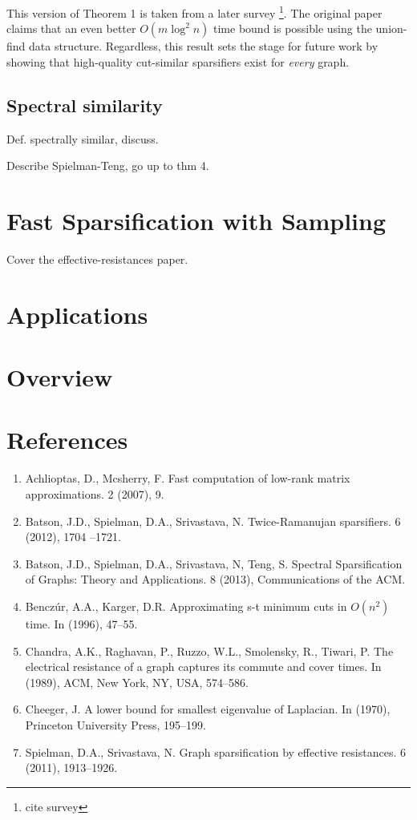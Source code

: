 \documentclass{article}
\begin{document}
This version of Theorem 1 is taken from a later survey \footnote{cite
survey}. The original paper claims that an even better $O(m\log^2 n)$ time
bound is possible using the union-find data structure. Regardless, this
result sets the stage for future work by showing that high-quality
cut-similar sparsifiers exist for \textit{every} graph. 

\subsection{Spectral similarity}

Def. spectrally similar, discuss.

Describe Spielman-Teng, go up to thm 4.

\section{Fast Sparsification with Sampling}

Cover the effective-resistances paper.

\section{Applications}

\section{Overview}

\section*{References}

\begin{enumerate}[1.]
    \item Achlioptas, D., Mcsherry, F. Fast computation of low-rank matrix
        approximations. 2 (2007), 9.

    \item Batson, J.D., Spielman, D.A., Srivastava, N.  Twice-Ramanujan
        sparsifiers. 6 (2012), 1704 –1721.

    \item Batson, J.D., Spielman, D.A., Srivastava, N, Teng, S.  Spectral
        Sparsification of Graphs: Theory and Applications. 8 (2013),
        Communications of the ACM.

    \item Bencz\'{u}r, A.A., Karger, D.R.  Approximating s-t minimum cuts in
        $O(n^2)$ time. In (1996), 47–55.

    \item Chandra, A.K., Raghavan, P., Ruzzo, W.L., Smolensky, R., Tiwari,
        P.  The electrical resistance of a graph captures its commute and
        cover times. In (1989), ACM, New York, NY, USA, 574–586.

    \item Cheeger, J. A lower bound for smallest eigenvalue of Laplacian. In
        (1970), Princeton University Press, 195–199.

    \item Spielman, D.A., Srivastava, N. Graph sparsification by effective
        resistances.  6 (2011), 1913–1926.
\end{enumerate}
\end{document}
